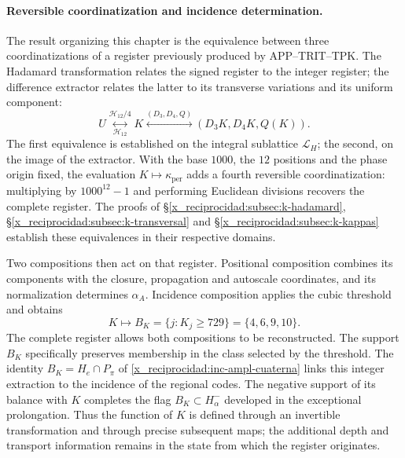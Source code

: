 \paragraph{Reversible coordinatization and incidence determination.}
\label{x_reciprocidad:ampl-alfa-k-intro-reversible}
The result organizing this chapter is the equivalence between three
coordinatizations of a register previously produced by
APP--TRIT--TPK. The Hadamard transformation relates the signed
register to the integer register; the difference extractor relates
the latter to its transverse variations and its uniform component:
\[
 U\underset{\mathcal H_{12}}{\overset{\mathcal H_{12}/4}{\longleftrightarrow}}K
 \overset{(D_3,D_4,Q)}{\longleftrightarrow}
 (D_3K,D_4K,Q(K)).
\]
The first equivalence is established on the integral sublattice
$\mathcal L_H$; the second, on the image of the extractor. With the
base $1000$, the $12$ positions and the phase origin fixed, the evaluation
$K\mapsto\kappa_{\mathrm{per}}$ adds a fourth reversible
coordinatization: multiplying by $1000^{12}-1$ and performing Euclidean
divisions recovers the complete register. The proofs of
\S\ref{x_reciprocidad:subsec:k-hadamard}, \S\ref{x_reciprocidad:subsec:k-transversal} and
\S\ref{x_reciprocidad:subsec:k-kappas} establish these equivalences in their respective
domains.

Two compositions then act on that register. Positional
composition combines its components with the closure,
propagation and autoscale coordinates, and its normalization determines $\alpha_A$. Incidence
composition applies the cubic threshold and obtains
\[
 K\longmapsto B_K=\{j:K_j\geq729\}=\{4,6,9,10\}.
\]
The complete register allows both compositions to be reconstructed. The support
$B_K$ specifically preserves membership in the class selected
by the threshold. The identity $B_K=H_e\cap P_\pi$ of
\eqref{x_reciprocidad:inc-ampl-cuaterna} links this integer extraction to the incidence
of the regional codes. The negative support of its balance with $K$
completes the flag $B_K\subset H^-_\alpha$ developed in the
exceptional prolongation. Thus the function of $K$ is defined through
an invertible transformation and through precise subsequent
maps; the additional depth and transport information remains
in the state from which the register originates.

